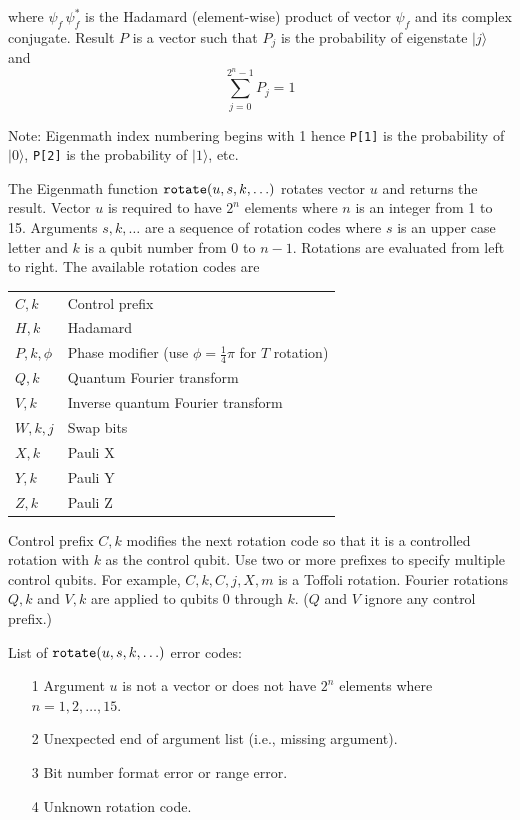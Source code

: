 \documentclass[12pt]{article}
\begin{document}
where $\psi_f\,\psi_f^*$
is the Hadamard (element-wise) product of vector $\psi_f$ and its complex conjugate.
Result $P$ is a vector such that $P_j$ is the
probability of eigenstate $|j\rangle$ and
\begin{equation*}
\sum_{j=0}^{2^n-1} P_j=1
\end{equation*}

Note: Eigenmath index numbering begins with 1 hence
\verb$P[1]$ is the probability of $|0\rangle$,
\verb$P[2]$ is the probability of $|1\rangle$, etc.

\bigskip
The Eigenmath function
$\text{\tt rotate}(u,s,k,\ldots)$
rotates vector $u$ and returns the result.
Vector $u$ is required to have $2^n$ elements where $n$ is an
integer from 1 to 15.
Arguments $s,k,\ldots$ are a sequence of rotation codes
where $s$ is an upper case letter and $k$ is a qubit number
from 0 to $n-1$.
Rotations are evaluated from left to right.
The available rotation codes are

\begin{center}
\begin{tabular}{ll}
$C,k$ & Control prefix
\\
$H,k$ & Hadamard
\\
$P,k,\phi$ & Phase modifier (use $\phi=\tfrac{1}{4}\pi$ for $T$ rotation)
\\
$Q,k$ & Quantum Fourier transform
\\
$V,k$ & Inverse quantum Fourier transform
\\
$W,k,j$ & Swap bits
\\
$X,k$ & Pauli X
\\
$Y,k$ & Pauli Y
\\
$Z,k$ & Pauli Z
\end{tabular}
\end{center}

Control prefix $C,k$ modifies the next rotation code so that it
is a controlled rotation with $k$ as the control qubit.
Use two or more prefixes to specify multiple control qubits.
For example, $C,k,C,j,X,m$ is a Toffoli rotation.
Fourier rotations $Q,k$ and $V,k$ are applied to qubits 0 through $k$.
($Q$ and $V$ ignore any control prefix.)

\bigskip
List of $\text{\tt rotate}(u,s,k,\ldots)$ error codes:
\begin{itemize}
\item[1] Argument $u$ is not a vector or does not have $2^n$ elements where $n=1,2,\ldots,15$.
\item[2] Unexpected end of argument list (i.e., missing argument).
\item[3] Bit number format error or range error.
\item[4] Unknown rotation code.
\end{itemize}
\end{document}
